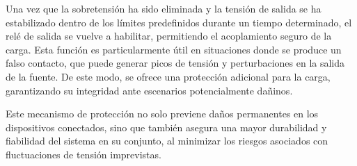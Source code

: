 Una vez que la sobretensión ha sido eliminada y la tensión de salida se ha estabilizado dentro de los límites predefinidos durante un tiempo determinado, el relé de salida se vuelve a habilitar, permitiendo el acoplamiento seguro de la carga. Esta función es particularmente útil en situaciones donde se produce un falso contacto, que puede generar picos de tensión y perturbaciones en la salida de la fuente. De este modo, se ofrece una protección adicional para la carga, garantizando su integridad ante escenarios potencialmente dañinos.\par
Este mecanismo de protección no solo previene daños permanentes en los dispositivos conectados, sino que también asegura una mayor durabilidad y fiabilidad del sistema en su conjunto, al minimizar los riesgos asociados con fluctuaciones de tensión imprevistas. \par
